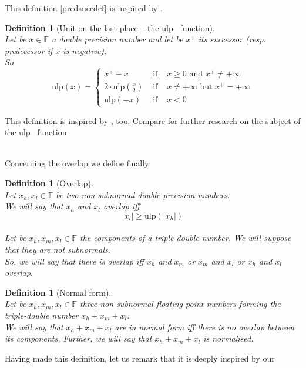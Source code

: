 \documentclass[a4paper,10pt,twoside]{article}
\newtheorem{definition}[theorem]{Definition}
\newcommand{\F}{\ensuremath{\mathbb {F}}}
\newcommand{\hi}{\ensuremath{\mathit{h}}}
\newcommand{\mi}{\ensuremath{\mathit{m}}}
\newcommand{\lo}{\ensuremath{\mathit{l}}}
\newcommand{\mUlp}{\ensuremath{\mathrm{ulp}}}
\begin{document}
This definition \ref{predsuccdef} is inspired by \cite{Defour-thesis}.
\begin{definition}[Unit on the last place -- the $\mUlp$~ function] \label{defulp} ~ \\
Let be $x \in \F$ a double precision number and let be $x^+$ its
successor (resp. predecessor if $x$ is negative). \\
So
$$\mUlp \left( x \right) = \left \lbrace
                   \begin{array}{lll} x^+ - x & \mbox{ if } & x \geq 0 \mbox{ and } x^+ \not = + \infty \\
                     2 \cdot \mUlp\left( \frac{x}{2} \right) & \mbox{ if } & x \not = + \infty \mbox{ but } x^+ = + \infty\\
                     \mUlp \left( -x \right) & \mbox{ if } & x < 0 \end{array} \right.$$
\end{definition}
This definition is inspired by \cite{Defour-thesis}, too. Compare \cite{Muller05INRIA}
for further research on the subject of the $\mUlp$~ function.\\~\par
Concerning the overlap we define finally:
\begin{definition}[Overlap]\label{defoverlap}~\\
Let $x_\hi, x_\lo \in \F$ be two non-subnormal double precision numbers. \\
We will say that $x_\hi$ and $x_\lo$ overlap iff
$$\left \vert x_\lo \right \vert \geq \mUlp\left( \left \vert x_\hi \right
\vert \right)$$~\\
Let be $x_\hi, x_\mi, x_\lo \in \F$ the components of a triple-double
number. We will suppose that they are not subnormals.\\
So, we will say that there is overlap iff
$x_\hi$ and $x_\mi$ or $x_\mi$ and $x_\lo$ or $x_\hi$ and $x_\lo$ overlap.
\end{definition}
\begin{definition}[Normal form]~\\
Let be $x_\hi, x_\mi, x_\lo \in \F$ three non-subnormal floating point numbers
forming the triple-double number $x_\hi + x_\mi + x_\lo$. \\
We will say that $x_\hi + x_\mi + x_\lo$ are in normal form iff there is no
overlap between its components.
Further, we will say that $x_\hi + x_\mi + x_\lo$ is normalised.
\end{definition} \par
Having made this definition, let us remark that it is deeply inspired by our
\end{document}
